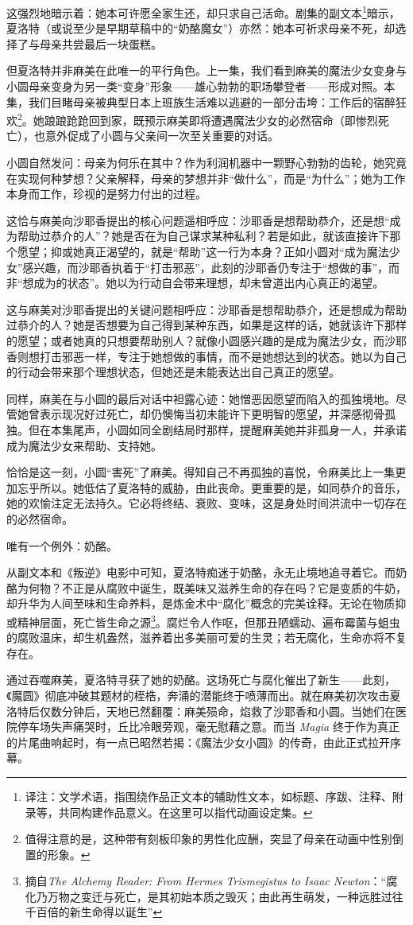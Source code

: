 这强烈地暗示着：她本可许愿全家生还，却只求自己活命。剧集的副文本\footnote{译注：文学术语，指围绕作品正文本的辅助性文本，如标题、序跋、注释、附录等，共同构建作品意义。在这里可以指代动画设定集。}暗示，夏洛特（或说至少是早期草稿中的“奶酪魔女”）亦然：她本可祈求母亲不死，却选择了与母亲共尝最后一块蛋糕\cite{ref26}。

但夏洛特并非麻美在此唯一的平行角色。上一集，我们看到麻美的魔法少女变身与小圆母亲变身为另一类“变身”形象——雄心勃勃的职场攀登者——形成对照。本集，我们目睹母亲被典型日本上班族生活难以逃避的一部分击垮：工作后的宿醉狂欢\footnote{值得注意的是，这种带有刻板印象的男性化应酬，突显了母亲在动画中性别倒置的形象。}\cite{ref27}。她踉踉跄跄回到家，既预示麻美即将遭遇魔法少女的必然宿命（即惨烈死亡），也意外促成了小圆与父亲间一次至关重要的对话。

小圆自然发问：母亲为何乐在其中？作为利润机器中一颗野心勃勃的齿轮，她究竟在实现何种梦想？父亲解释，母亲的梦想并非“做什么”，而是“为什么”；她为工作本身而工作，珍视的是努力付出的过程。

这恰与麻美向沙耶香提出的核心问题遥相呼应：沙耶香是想帮助恭介，还是想“成为帮助过恭介的人”？她是否在为自己谋求某种私利？若是如此，就该直接许下那个愿望；抑或她真正渴望的，就是“帮助”这一行为本身？正如小圆对“成为魔法少女”感兴趣，而沙耶香执着于“打击邪恶”，此刻的沙耶香仍专注于“想做的事”，而非“想成为的状态”。她以为行动自会带来理想，却未曾道出内心真正的渴望。

这与麻美对沙耶香提出的关键问题相呼应：沙耶香是想帮助恭介，还是想成为帮助过恭介的人？她是否想要为自己得到某种东西，如果是这样的话，她就该许下那样的愿望；或者她真的只想要帮助别人？就像小圆感兴趣的是成为魔法少女，而沙耶香则想打击邪恶一样，专注于她想做的事情，而不是她想达到的状态。她以为自己的行动会带来那个理想状态，但她还是未能表达出自己真正的愿望。

同样，麻美在与小圆的最后对话中袒露心迹：她憎恶因愿望而陷入的孤独境地。尽管她曾表示现况好过死亡，却仍懊悔当初未能许下更明智的愿望，并深感彻骨孤独。但在本集尾声，小圆如同全剧结局时那样，提醒麻美她并非孤身一人，并承诺成为魔法少女来帮助、支持她。

恰恰是这一刻，小圆“害死”了麻美。得知自己不再孤独的喜悦，令麻美比上一集更加忘乎所以。她低估了夏洛特的威胁，由此丧命。更重要的是，如同恭介的音乐，她的欢愉注定无法持久。它必将终结、衰败、变味，这是身处时间洪流中一切存在的必然宿命。

唯有一个例外：奶酪。

从副文本和《叛逆》电影中可知，夏洛特痴迷于奶酪，永无止境地追寻着它。而奶酪为何物？不正是从腐败中诞生，既美味又滋养生命的存在吗？它是变质的牛奶，却升华为人间至味和生命养料，是炼金术中“腐化”概念的完美诠释。无论在物质抑或精神层面，死亡皆生命之源\footnote{摘自\emph{The Alchemy Reader: From Hermes Trismegistus to Isaac Newton}：“腐化乃万物之变迁与死亡，是其初始本质之毁灭；由此再生萌发，一种远胜过往千百倍的新生命得以诞生”}\cite{ref28}。腐烂令人作呕，但那丑陋蠕动、遍布霉菌与蛆虫的腐败温床，却生机盎然，滋养着出多美丽可爱的生灵；若无腐化，生命亦将不复存在。

通过吞噬麻美，夏洛特寻获了她的奶酪。这场死亡与腐化催出了新生——此刻，《魔圆》彻底冲破其题材的桎梏，奔涌的潜能终于喷薄而出。就在麻美初次攻击夏洛特后仅数分钟后，天地已然翻覆：麻美殒命，焰救了沙耶香和小圆。当她们在医院停车场失声痛哭时，丘比冷眼旁观，毫无慰藉之意。而当 \emph{Magia} 终于作为真正的片尾曲响起时，有一点已昭然若揭：《魔法少女小圆》的传奇，由此正式拉开序幕。
